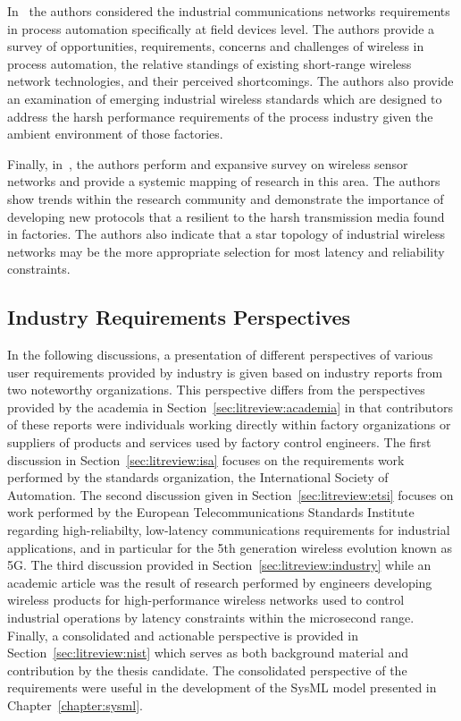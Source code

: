 In~\cite{Ikram2010} the authors considered the industrial communications networks requirements in process automation specifically at field devices level. The authors provide a survey of opportunities, requirements, concerns and challenges of wireless in process automation, the relative standings of existing short-range wireless network technologies, and their perceived shortcomings. The authors also provide an examination of emerging industrial wireless standards which are designed to address the harsh performance requirements of the process industry given the ambient environment of those factories.

Finally, in~\cite{QUEIROZ201796}, the authors perform and expansive survey on wireless sensor networks and provide a systemic mapping of research in this area.  The authors show trends within the research community and demonstrate the importance of developing new protocols that a resilient to the harsh transmission media found in factories.  The authors also indicate that a star topology of industrial wireless networks may be the more appropriate selection for most latency and reliability constraints.


\subsection{Industry Requirements Perspectives}

In the following discussions, a presentation of different perspectives of various user requirements provided by industry is given based on industry reports from two noteworthy organizations.  This perspective differs from the perspectives provided by the academia in Section~\ref{sec:litreview:academia} in that contributors of these reports were individuals working directly within factory organizations or suppliers of products and services used by factory control engineers.  The first discussion in Section~\ref{sec:litreview:isa} focuses on the requirements work performed by the standards organization, the International Society of Automation.  The second discussion given in Section~\ref{sec:litreview:etsi} focuses on work performed by the European Telecommunications Standards Institute regarding high-reliabilty, low-latency communications requirements for industrial applications, and in particular for the 5th generation wireless evolution known as 5G.  The third discussion provided in Section~\ref{sec:litreview:industry} while an academic article was the result of research performed by engineers developing wireless products for high-performance wireless networks used to control industrial operations by latency constraints within the microsecond range.  Finally, a consolidated and actionable perspective is provided in Section~\ref{sec:litreview:nist} which serves as both background material and contribution by the thesis candidate.  The consolidated perspective of the requirements were useful in the development of the SysML model presented in Chapter~\ref{chapter:sysml}.

